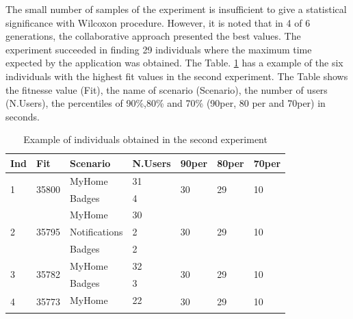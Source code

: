 The small number of samples of the experiment is insufficient to give a statistical significance with Wilcoxon procedure. However, it is noted that in 4 of 6 generations, the collaborative approach presented the best values. The experiment succeeded in finding 29 individuals where the maximum time expected by the application was obtained.  The Table. \ref{tab:secondexperiment1} has a example of the six individuals with the highest fit values in the second experiment. The Table shows the fitnesse value (Fit),  the name of scenario (Scenario), the number of users (N.Users), the percentiles of 90\%,80\% and 70\% (90per, 80 per and 70per) in seconds.  

\begin{table}[h]
\centering
\caption{Example of individuals obtained in the second experiment}
\label{tab:secondexperiment1}
\begin{tabular}{|l|l|l|l|l|l|l|}
\hline
Ind&Fit&Scenario&N.Users&90per&80per&70per\\ \hline
\multirow{2}{*}{1} & \multirow{2}{*}{35800} & MyHome        & 31              & \multirow{2}{*}{30} & \multirow{2}{*}{29} & \multirow{2}{*}{10} \\ \cline{3-4}
                   &                        & Badges        & 4               &                     &                     &                     \\ \hline
\multirow{3}{*}{2} & \multirow{3}{*}{35795} & MyHome        & 30              & \multirow{3}{*}{30} & \multirow{3}{*}{29} & \multirow{3}{*}{10} \\ \cline{3-4}
                   &                        & Notifications & 2               &                     &                     &                     \\ \cline{3-4}
                   &                        & Badges        & 2               &                     &                     &                     \\ \hline
\multirow{2}{*}{3} & \multirow{2}{*}{35782} & MyHome        & 32              & \multirow{2}{*}{30} & \multirow{2}{*}{29} & \multirow{2}{*}{10} \\ \cline{3-4}
                   &                        & Badges        & 3               &                     &                     &                     \\ \hline
\multirow{3}{*}{4} & \multirow{3}{*}{35773} & MyHome        & 22              & \multirow{3}{*}{30} & \multirow{3}{*}{29} & \multirow{3}{*}{10} \\ \cline{3-4}

\end{tabular}
\end{table}
